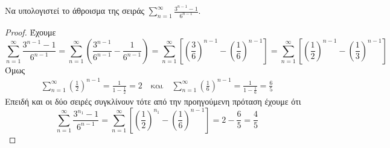 \begin{example}
\begin{enumerate}
        \item Να υπολογιστεί το άθροισμα της σειράς $ \sum_{n=1}^{\infty} 
            \frac{3^{n-1}-1}{6^{n-1}} $.
            \begin{proof}
            \item {}
                Έχουμε 
                \[ 
                    \sum_{n=1}^{\infty} \frac{3^{n-1}-1}{6^{n-1}} = \sum_{n=1}^{\infty} 
                    \left(\frac{3^{n-1}}{6^{n-1}} - \frac{1}{6^{n-1}}\right) = 
                    \sum_{n=1}^{\infty} \left[\left(\frac{3}{6} \right)^{n-1} -
                    \left( \frac{1}{6}\right) ^{n-1}\right] = \sum_{n=1}^{\infty} 
                    \left[\left(\frac{1}{2} \right)^{n-1} - \left(\frac{1}{3} 
                    \right)^{n-1}\right]
                \]
                Όμως 
                \begin{align*}
                    \sum_{n=1}^{\infty} \left(\frac{1}{2} \right)^{n-1} 
                    = \frac{1}{1- \frac{1}{2}} = 2
                    \quad \text{και} \quad
                    \sum_{n=1}^{\infty} \left(\frac{1}{6} \right)^{n-1} 
                    = \frac{1}{1- \frac{1}{6}} = \frac{6}{5} 
                \end{align*} 
                Επειδή και οι δύο σειρές συγκλίνουν τότε από την προηγούμενη 
                πρόταση έχουμε ότι 
                \[
                    \sum_{n=1}^{\infty} \frac{3^{n_1}-1}{6^{n-1}} =  
                    \sum_{n=1}^{\infty} \left[\left(\frac{1}{2} \right)^{n_1} - 
                    \left(\frac{1}{6} \right)^{n-1}\right] = 2 - \frac{6}{5} = 
                    \frac{4}{5} 
                \] 
            \end{proof}
    \end{enumerate}
\end{example}

